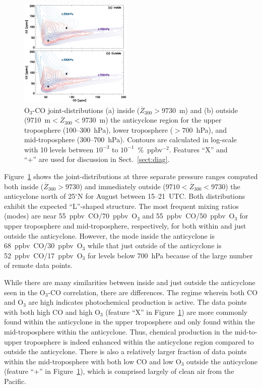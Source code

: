 \begin{figure}
	\centering
	\begin{singlespacing}
	\includegraphics[width=0.48\textwidth]{Figures/o3co.eps}
	\caption[O$_3$-CO joint-distributions]{{\small
	O$_3$-CO joint-distributions (a) inside ($\overline{Z}_{300}>9730$~m)
	and (b) outside (9710~m$<\overline{Z}_{300}<$9730~m) the anticyclone region for
	the upper troposphere (100--300~hPa), lower troposphere ($>700$~hPa), and mid-troposphere (300--700~hPa).
	Contours are calculated in log-scale with 10 levels between $10^{-3}$ to $10^{-1}$~\%~ppbv$^{-2}$.
	Features ``X'' and ``+'' are used for discussion in Sect.~\ref{sect:diag}.}}
	\label{fig:o3co}
	\end{singlespacing}
\end{figure}

Figure~\ref{fig:o3co} shows the joint-distributions at three separate pressure ranges
computed both inside ($\overline Z_{300}>9730$) and immediately
outside ($9710<\overline Z_{300}<9730$) the anticyclone north of 25$^\circ$N for
August between 15--21~UTC. Both distributions exhibit the expected ``L''-shaped
structure. The most frequent mixing ratios (modes) are near 55~ppbv~CO/70~ppbv~O$_3$ and 55~ppbv~CO/50~ppbv~O$_3$ for
upper troposphere and mid-troposphere, respectively, for both within and just outside the anticyclone.
However, the mode inside the anticyclone is 68~ppbv~CO/30~ppbv~O$_3$ while that
just outside of the anticyclone is 52~ppbv~CO/17~ppbv~O$_3$ for levels below 700~hPa
because of the large number of remote data points.

While there are many similarities between inside and just outside the anticyclone seen in the O$_3$-CO correlation,
there are differences. The regime wherein both CO and O$_3$ are high indicates photochemical production is active.
The data points with both high CO and high O$_3$ (feature ``X'' in Figure~\ref{fig:o3co})
are more commonly found within the anticyclone in the upper troposphere and only
found within the mid-troposphere within the anticyclone. Thus, chemical
production in the mid-to-upper troposphere is indeed enhanced within the anticyclone region compared to outside the anticyclone.
There is also a relatively larger fraction of data points within the mid-troposphere with both low CO
and low O$_3$ outside the anticyclone (feature ``+'' in Figure~\ref{fig:o3co}), which
is comprised largely of clean air from the Pacific.

